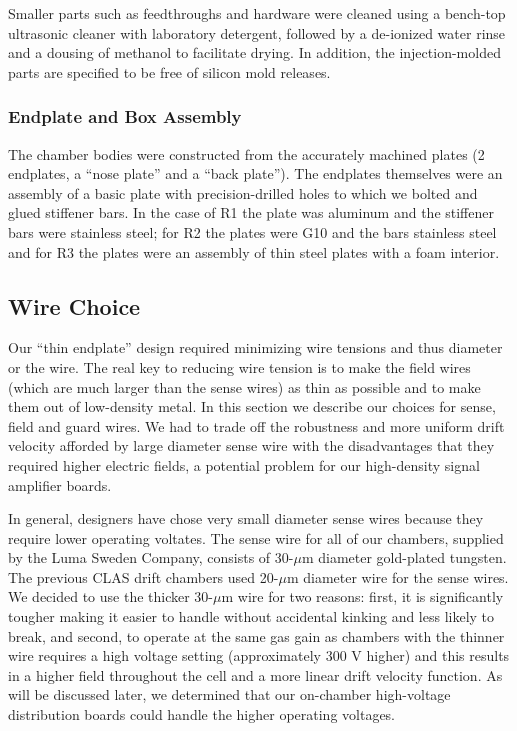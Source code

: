 Smaller parts such as feedthroughs and hardware were cleaned using a 
bench-top ultrasonic cleaner with laboratory detergent, followed by a 
de-ionized water rinse and a dousing of methanol to facilitate drying.  
In addition, the injection-molded parts are specified to be free of silicon 
mold releases.

\subsubsection{Endplate and Box Assembly}


The chamber bodies were constructed from the accurately machined plates
(2 endplates, a ``nose plate'' and a ``back plate'').
The endplates themselves were an assembly of a basic plate with precision-drilled
holes to which we bolted and glued stiffener bars.  In the case of
R1 the plate was aluminum and the stiffener bars were stainless steel;
for R2 the plates were G10 and the bars stainless steel and for R3
the plates were an assembly of thin steel plates with a foam interior.






\subsection{Wire Choice}
\hskip 0.15in

Our ``thin endplate'' design required minimizing wire tensions and
thus diameter or the wire.  The real key to reducing wire tension is to
make the field wires (which are much larger than the sense wires) as 
thin as possible and to make them out of low-density metal.  In this 
section we describe our choices for sense, field and guard wires.
We had to trade off the robustness and more uniform drift velocity
afforded by large diameter sense wire with the disadvantages that they
required higher electric fields, a potential problem for our high-density
signal amplifier boards.

In general, designers have chose very small diameter sense wires because they
require lower operating voltates.
The sense wire for all of our chambers, supplied by the Luma
Sweden Company, consists of 30-$\mu$m diameter gold-plated tungsten.  
The previous CLAS drift chambers used 20-$\mu$m diameter wire for the
sense wires.  We decided to use the thicker 30-$\mu$m wire for two 
reasons: first, it is significantly tougher making it easier to handle without
accidental kinking and less likely to break, and second, to operate at the same 
gas gain as chambers with the thinner wire requires a high voltage setting 
(approximately 300 V higher) and this results in a higher field throughout the cell
and a more linear drift velocity function.  As will be discussed later,
we determined that our on-chamber high-voltage distribution boards could
handle the higher operating voltages.

